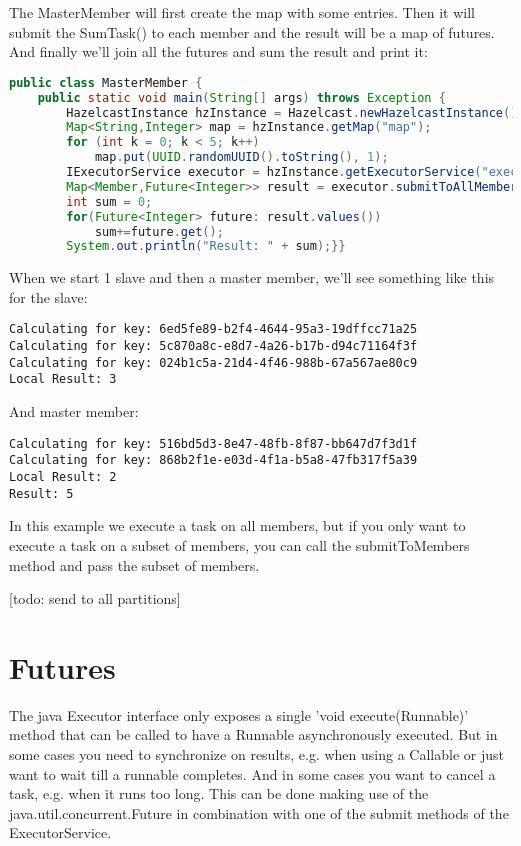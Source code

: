The MasterMember will first create the map with some entries. Then it will submit the SumTask() to each member and the result will be a map of futures. And finally we'll join all the futures and sum the result and print it:
\begin{lstlisting}[language=java]
public class MasterMember {
    public static void main(String[] args) throws Exception {
        HazelcastInstance hzInstance = Hazelcast.newHazelcastInstance();
        Map<String,Integer> map = hzInstance.getMap("map");
        for (int k = 0; k < 5; k++)
            map.put(UUID.randomUUID().toString(), 1);
        IExecutorService executor = hzInstance.getExecutorService("executor");
        Map<Member,Future<Integer>> result = executor.submitToAllMembers (new SumTask());
        int sum = 0;
        for(Future<Integer> future: result.values())
            sum+=future.get();
        System.out.println("Result: " + sum);}}
\end{lstlisting}
When we start 1 slave and then a master member, we'll see something like this for the slave:
\begin{lstlisting}
Calculating for key: 6ed5fe89-b2f4-4644-95a3-19dffcc71a25
Calculating for key: 5c870a8c-e8d7-4a26-b17b-d94c71164f3f
Calculating for key: 024b1c5a-21d4-4f46-988b-67a567ae80c9
Local Result: 3
\end{lstlisting}
And master member:
\begin{lstlisting}
Calculating for key: 516bd5d3-8e47-48fb-8f87-bb647d7f3d1f
Calculating for key: 868b2f1e-e03d-4f1a-b5a8-47fb317f5a39
Local Result: 2
Result: 5
\end{lstlisting}
In this example we execute a task on all members, but if you only want to execute a task on a subset of members, you can call the submitToMembers method and pass the subset of members.

[todo: send to all partitions]

\section{Futures}
The java Executor interface only exposes a single 'void execute(Runnable)' method that can be called to have a Runnable asynchronously executed. But in some cases you need to synchronize on results, e.g. when using a Callable or just want to wait till a runnable completes. And in some cases you want to cancel a task, e.g. when it runs too long. This can be done making use of the java.util.concurrent.Future in combination with one of the submit methods of the ExecutorService.

